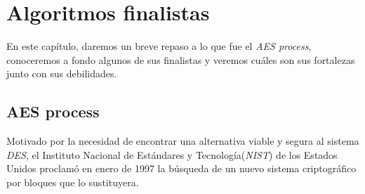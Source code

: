 \chapter{Algoritmos finalistas}
\label{chp:finalists}

En este capítulo, daremos un breve repaso a lo que fue el \textit{AES process}, conoceremos a fondo algunos de sus finalistas y veremos cuáles son sus fortalezas junto con sus debilidades.

\section{AES process}
\label{sec:AES}
Motivado por la necesidad de encontrar una alternativa viable y segura al sistema \textit{DES}, el Instituto Nacional de Estándares y Tecnología(\textit{NIST}) de los Estados Unidos proclamó en enero de 1997 la búsqueda de un nuevo sistema criptográfico por bloques que lo sustituyera.

